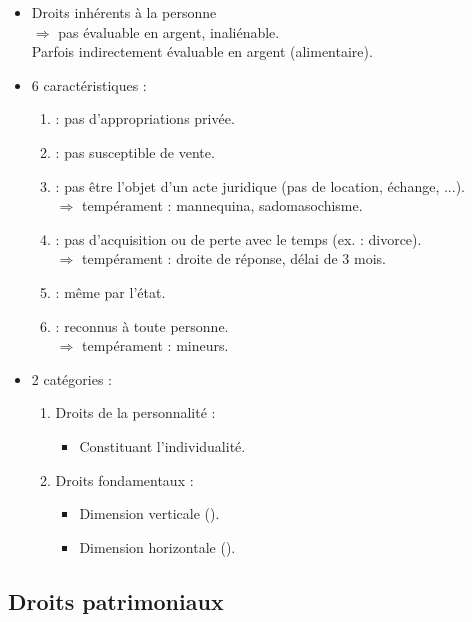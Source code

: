 \begin{itemize}
	\item Droits inhérents à la personne \\
	$\Rightarrow$ pas évaluable en argent, inaliénable.\\
	\textred{!} Parfois indirectement évaluable en argent (alimentaire).
	\item 6 caractéristiques :
	\begin{enumerate}
		\item {} : pas d'appropriations privée.
		\item {} : pas susceptible de vente.
		\item {} : pas être l'objet d'un acte juridique (pas de location, échange, ...).\\
		$\Rightarrow$ tempérament : mannequina, sadomasochisme.
		\item {} : pas d'acquisition ou de perte avec le temps (ex. : divorce).\\
		$\Rightarrow$ tempérament : droite de réponse, délai de 3 mois.
		\item {} : même par l'état.
		\item {} : reconnus à toute personne.\\
		$\Rightarrow$ tempérament : mineurs.
	\end{enumerate}
	\item 2 catégories :
	\begin{enumerate}
		\item Droits de la personnalité :
		\begin{itemize}
			\item Constituant l'individualité.
		\end{itemize}
		\item Droits fondamentaux :
		\begin{itemize}
			\item Dimension verticale ().
			\item Dimension horizontale ().
		\end{itemize}
	\end{enumerate}
\end{itemize}

\subsection{Droits patrimoniaux}

